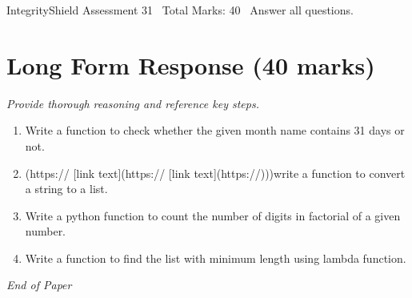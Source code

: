 \documentclass[12pt]{article}
\begin{document}
\begin{center}
IntegrityShield Assessment 31 \
Total Marks: 40 \
Answer all questions.
\end{center}

\section*{Long Form Response (40 marks)}
\textit{Provide thorough reasoning and reference key steps.}
\begin{enumerate}[label=\arabic*.]
\item Write a function to check whether the given month name contains 31 days or not.
\item [link text](https:// [link text](https:// [link text](https://)))write a function to
convert a string to a list.
\item Write a python function to count the number of digits in factorial of a given number.
\item Write a function to find the list with minimum length using lambda function.
\end{enumerate}

\vfill
\noindent\textit{End of Paper}
\end{document}
